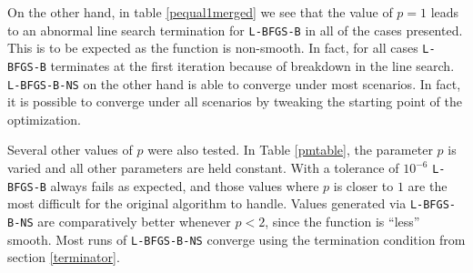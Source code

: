 On the other hand, in table \ref{pequal1merged} we see that the value of $p = 1$ leads to an abnormal line search termination for \texttt{L-BFGS-B} in all of the cases presented. This is to be expected as the function is non-smooth. In fact, for all cases \texttt{L-BFGS-B} terminates at the first iteration because of breakdown in the line search.  \texttt{L-BFGS-B-NS} on the other hand is able to converge under most scenarios. In fact, it is possible to converge under all scenarios by tweaking the starting point of the optimization.

Several other values of $p$ were also tested. In Table \ref{pmtable}, the parameter $p$ is varied and all other parameters are held constant. With a tolerance of $10^{-6}$ \texttt{L-BFGS-B} always fails as expected, and those values where $p$ is closer to $1$ are the most difficult for the original algorithm to handle.  Values generated via \texttt{L-BFGS-B-NS} are comparatively better whenever $p < 2$, since the function is ``less'' smooth. Most runs of \texttt{L-BFGS-B-NS} converge using the termination condition from section \ref{terminator}.

